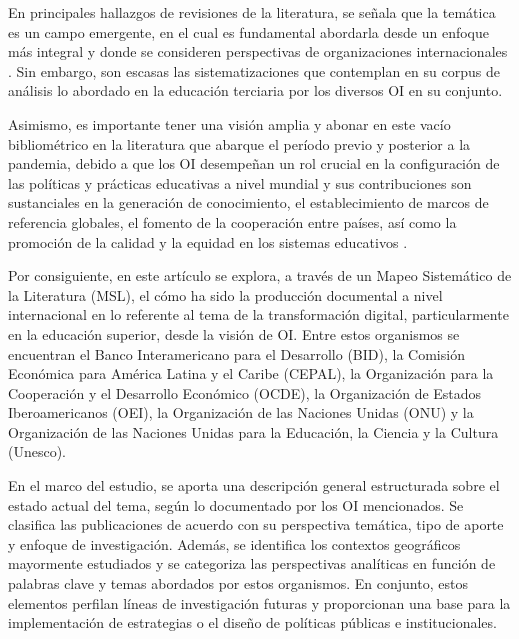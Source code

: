 En principales hallazgos de revisiones de la literatura, se señala que
la temática es un campo emergente, en el cual es fundamental abordarla
desde un enfoque más integral \cite{benavides2020-castro} y donde se
consideren perspectivas de organizaciones internacionales \cite{Wang2024}. Sin embargo, son escasas las sistematizaciones que
contemplan en su corpus de análisis lo abordado en la educación
terciaria por los diversos OI en su conjunto.

Asimismo, es importante tener una visión amplia y abonar en este vacío
bibliométrico en la literatura que abarque el período previo y posterior
a la pandemia, debido a que los OI desempeñan un rol crucial en la
configuración de las políticas y prácticas educativas a nivel mundial y
sus contribuciones son sustanciales en la generación de conocimiento, el
establecimiento de marcos de referencia globales, el fomento de la
cooperación entre países, así como la promoción de la calidad y la
equidad en los sistemas educativos \cite{lamprou2023role,maldonado-maldonado2023,martens2023}.

Por consiguiente, en este artículo se explora, a través de un Mapeo
Sistemático de la Literatura (MSL), el cómo ha sido la producción
documental a nivel internacional en lo referente al tema de la
transformación digital, particularmente en la educación superior, desde
la visión de OI. Entre estos organismos se encuentran el Banco
Interamericano para el Desarrollo (BID), la Comisión Económica para
América Latina y el Caribe (CEPAL), la Organización para la Cooperación
y el Desarrollo Económico (OCDE), la Organización de Estados
Iberoamericanos (OEI), la Organización de las Naciones Unidas (ONU) y la
Organización de las Naciones Unidas para la Educación, la Ciencia y la
Cultura (Unesco).

En el marco del estudio, se aporta una descripción general estructurada
sobre el estado actual del tema, según lo documentado por los OI
mencionados. Se clasifica las publicaciones de acuerdo con su
perspectiva temática, tipo de aporte y enfoque de investigación. Además,
se identifica los contextos geográficos mayormente estudiados y se
categoriza las perspectivas analíticas en función de palabras clave y
temas abordados por estos organismos. En conjunto, estos elementos
perfilan líneas de investigación futuras y proporcionan una base para la
implementación de estrategias o el diseño de políticas públicas e
institucionales.
